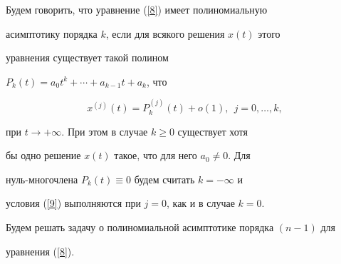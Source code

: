 \begin{defn}\label{D_3}


Будем говорить, что уравнение (\ref{8}) имеет полиномиальную


асимптотику порядка $k$, если для всякого решения $x(t)$ этого


уравнения существует такой полином


$P_{k}(t)=a_{0}t^k+\dotsb+a_{k-1}t+a_{k}$, что


\begin{equation}


\label{9}


x^{(j)}(t)=P_{k}^{(j)}(t)+o(1),\ \ j=0,\dotsc,k,


\end{equation}


при $t \rightarrow +\infty$. При этом в случае $k \geq 0$ существует хотя


бы одно решение $x(t)$ такое, что для него $a_{0}\not= 0$. Для


нуль-многочлена $P_{k}(t)\equiv 0$ будем считать $k=-\infty$ и


условия (\ref{9}) выполняются при $j=0$, как и в случае $k=0$.


\end{defn}





Будем решать задачу о полиномиальной асимптотике порядка $(n-1)$ для


уравнения (\ref{8}).





